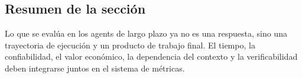 \subsection{Resumen de la sección}

Lo que se evalúa en los agents de largo plazo ya no es una respuesta, sino una trayectoria de ejecución y un producto de trabajo final. El tiempo, la confiabilidad, el valor económico, la dependencia del contexto y la verificabilidad deben integrarse juntos en el sistema de métricas.

